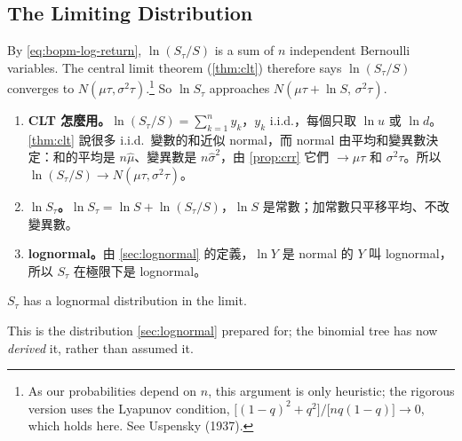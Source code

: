 \subsection{The Limiting Distribution}
\label{sec:bs-step2}


\suppstart
{}
\suppend

By \eqref{eq:bopm-log-return}, $\ln(S_{\tau}/S)$ is a sum of $n$ independent Bernoulli variables.
The central limit theorem (\autoref{thm:clt}) therefore says $\ln(S_{\tau}/S)$ converges to $N(\mu\tau,\sigma^{2}\tau)$.\footnote{As our probabilities depend on $n$, this argument is only heuristic; the rigorous version uses the Lyapunov condition, $\bigl[(1-q)^{2}+q^{2}\bigr]/\bigl[nq(1-q)\bigr]\to0$, which holds here. See Uspensky (1937).}
So $\ln S_{\tau}$ approaches $N(\mu\tau+\ln S,\,\sigma^{2}\tau)$.

\suppstart
\begin{remark}
	\begin{enumerate}[(1),nosep]
		\item \textbf{CLT 怎麼用。}$\ln(S_{\tau}/S)=\sum_{k=1}^{n}y_{k}$，$y_{k}$ i.i.d.，每個只取 $\ln u$ 或 $\ln d$。\autoref{thm:clt} 說很多 i.i.d.\ 變數的和近似 normal，而 normal 由平均和變異數決定：和的平均是 $n\hat{\mu}$、變異數是 $n\hat{\sigma}^{2}$，由 \autoref{prop:crr} 它們 $\to\mu\tau$ 和 $\sigma^{2}\tau$。所以 $\ln(S_{\tau}/S)\to N(\mu\tau,\sigma^{2}\tau)$。
		\item \textbf{$\ln S_{\tau}$。}$\ln S_{\tau}=\ln S+\ln(S_{\tau}/S)$，$\ln S$ 是常數；加常數只平移平均、不改變異數。
		\item \textbf{lognormal。}由 \autoref{sec:lognormal} 的定義，$\ln Y$ 是 normal 的 $Y$ 叫 lognormal，所以 $S_{\tau}$ 在極限下是 lognormal。
	\end{enumerate}
\end{remark}
\suppend

\begin{moral}
	$S_{\tau}$ has a lognormal distribution in the limit.
\end{moral}

\suppstart
\begin{moral}
	This is the distribution \autoref{sec:lognormal} prepared for; the binomial tree has now \emph{derived} it, rather than assumed it.
\end{moral}
\suppend

\suppstart
{}

